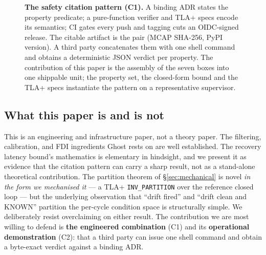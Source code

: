 \documentclass[acmsmall,nonacm=true,review=false]{acmart}
\theoremstyle{plain}
\begin{document}
\begin{figure}[t]
\caption{\textbf{The safety citation pattern (C1).} A binding ADR
states the property predicate; a pure-function verifier and TLA+
specs encode its semantics; CI gates every push and tagging cuts an
OIDC-signed release. The citable artifact is the pair
(MCAP SHA-256, PyPI version). A third party concatenates them with
one shell command and obtains a deterministic JSON verdict per
property. The contribution of this paper is the assembly of the
seven boxes into one shippable unit; the property set, the
closed-form bound and the TLA+ specs instantiate the pattern on a
representative supervisor.}
\label{fig:pattern}
\end{figure}

\subsection{What this paper is and is not}

This is an engineering and infrastructure paper, not a theory paper.
The filtering, calibration, and FDI ingredients Ghost rests on are
well established. The recovery latency bound's mathematics is elementary
in hindsight, and we present it as evidence that the citation
pattern can carry a sharp result, not as a stand-alone theoretical
contribution. The partition theorem of \S\ref{sec:mechanical} is
novel \emph{in the form we mechanised it} --- a TLA+
\texttt{INV\_PARTITION} over the reference closed loop --- but the
underlying observation that ``drift fired'' and ``drift clean and
KNOWN'' partition the per-cycle condition space is structurally
simple. We deliberately resist overclaiming on either result. The
contribution we are most willing to defend is \textbf{the engineered
combination} (C1) and its \textbf{operational demonstration} (C2):
that a third party can issue one shell command and obtain a
byte-exact verdict against a binding ADR.
\end{document}
